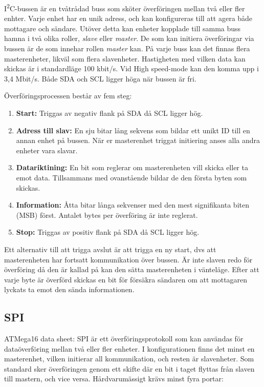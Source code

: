 \documentclass[11pt]{article}
\begin{document}
\begin{flushleft}
I\textsuperscript{2}C-bussen är en tvåtrådad buss som sköter överföringen mellan två eller fler enhter. Varje enhet har en unik adress, och kan konfigureras till att agera både mottagare och sändare. Utöver detta kan enheter kopplade till samma buss hamna i två olika roller, \textit{slave} eller \textit{master}. De som kan initiera överföringar via bussen är de som innehar rollen \textit{master} kan. På varje buss kan det finnas flera masterenheter, likväl som flera slavenheter. Hastigheten med vilken data kan skickas är i standardläge 100 kbit/s. Vid High speed-mode kan den komma upp i 3,4 Mbit/s. Både SDA och SCL ligger höga när bussen är fri.

Överföringsprocessen består av fem steg: 

\begin{enumerate}
	\item \textbf{Start:} Triggas av negativ flank på SDA då SCL ligger hög.
	\item \textbf{Adress till slav:} En sju bitar lång sekvens som bildar ett unikt ID till en annan enhet på bussen. När er masterenhet triggat initiering anses alla andra enheter vara slavar.
	\item \textbf{Datariktining:} En bit som reglerar om masterenheten vill skicka eller ta emot data. Tillsammans med ovanstående bildar de den första byten som skickas.
	\item \textbf{Information:} Åtta bitar långa sekvenser med den mest signifikanta biten (MSB) först. Antalet bytes per överföring är inte reglerat.
	\item \textbf{Stop:} Triggas av positiv flank på SDA då SCL ligger hög.
\end{enumerate}

Ett alternativ till att trigga avslut är att trigga en ny start, dvs att masterenheten har fortsatt kommunikation över bussen. Är inte slaven redo för överföring då den är kallad på kan den sätta masterenheten i vänteläge. Efter att varje byte är överförd skickas en bit för försäkra sändaren om att mottagaren lyckats ta emot den sända informationen. \cite{guideI2CPhilips}

\subsection{SPI}
ATMega16 data sheet:
SPI är ett överföringsprotokoll som kan användas för dataöverföring mellan två eller fler enheter. I konfigurationen finns det minst en masterenhet, vilken initierar all kommunikation, och resten är slavenheter. Som standard sker överföringen genom ett skifte där en bit i taget flyttas från slaven till mastern, och vice versa. Hårdvarumässigt krävs minst fyra portar:


\end{flushleft}
\end{document}
